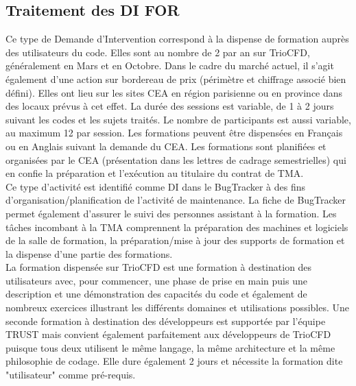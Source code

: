 \subsection{Traitement des DI FOR}
Ce type de Demande d'Intervention correspond à la dispense de formation auprès des utilisateurs du code. Elles sont au nombre de 2 par an sur TrioCFD, généralement en Mars et en Octobre. Dans le cadre du marché actuel, il s'agit également d'une action sur bordereau de prix (périmètre et chiffrage associé bien défini). Elles ont lieu sur les sites CEA en région parisienne ou en province dans des locaux prévus à cet effet. La durée des sessions est variable, de 1 à 2 jours suivant les codes et les sujets traités. Le nombre de participants est aussi variable, au maximum 12 par session. Les formations peuvent être dispensées en Français ou en Anglais suivant la demande du CEA. Les formations sont planifiées et organisées par le CEA (présentation dans les lettres de cadrage semestrielles) qui en confie la préparation et l'exécution au titulaire du contrat de TMA. \\

Ce type d'activité est identifié comme DI dans le BugTracker à des fins d'organisation/planification de l'activité de maintenance. La fiche de BugTracker permet également d'assurer le suivi des personnes assistant à la formation. Les tâches incombant à la TMA comprennent la préparation des machines et logiciels de la salle de formation, la préparation/mise à jour des supports de formation et la dispense d'une partie des formations.\\

La formation dispensée sur TrioCFD est une formation à destination des utilisateurs avec, pour commencer, une phase de prise en main puis une description et une démonstration des capacités du code et également de nombreux exercices illustrant les différents domaines et utilisations possibles. Une seconde formation à destination des développeurs est supportée par l'équipe TRUST mais convient également parfaitement aux développeurs de TrioCFD puisque tous deux utilisent le même langage, la même architecture et la même philosophie de codage. Elle dure également 2 jours et nécessite la formation dite "utilisateur" comme pré-requis.\\

